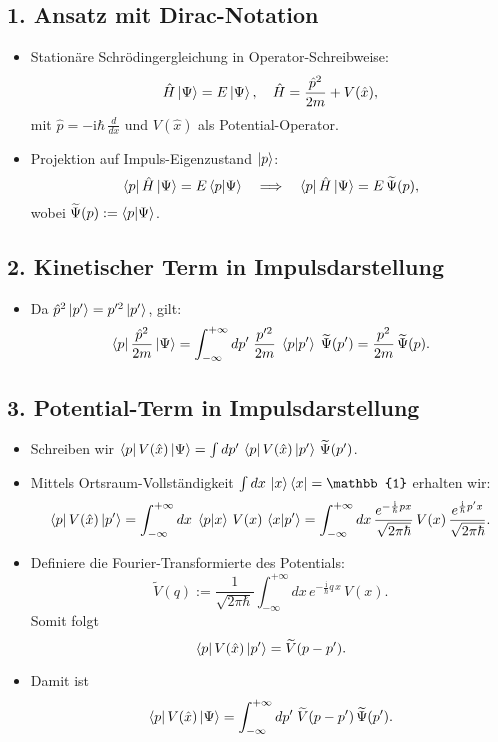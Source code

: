 \documentclass[12pt,a4paper]{scrartcl}
\begin{document}
\subsection*{1. Ansatz mit Dirac-Notation}

\begin{itemize}
  \item Stationäre Schrödingergleichung in Operator-Schreibweise:
  \[
    \hat H \ket{\Psi} = E \ket{\Psi}, \quad \hat H = \frac{\hat p^2}{2m} + V(\hat x),
  \]
  mit $\hat p = -\mathrm{i}\hbar\,\frac{d}{dx}$ und $V(\hat x)$ als Potential-Operator.
  \item Projektion auf Impuls-Eigenzustand $\ket{p}$:
  \[
    \bra{p} \hat H \ket{\Psi} = E \bra{p} \ket{\Psi} \quad\Longrightarrow\quad
    \bra{p} \hat H \ket{\Psi} = E\,\widetilde\Psi(p),
  \]
  wobei $\widetilde\Psi(p) := \braket{p}{\Psi}$.
\end{itemize}

\subsection*{2. Kinetischer Term in Impulsdarstellung}

\begin{itemize}
  \item Da $\hat p^2 \ket{p'} = p'^2 \ket{p'}$, gilt:
  \[
    \bra{p} \frac{\hat p^2}{2m} \ket{\Psi}
    = \int_{-\infty}^{+\infty} dp'\;\frac{p'^2}{2m}\;\braket{p}{p'}\;\widetilde\Psi(p')
    = \frac{p^2}{2m}\,\widetilde\Psi(p).
  \]
\end{itemize}

\subsection*{3. Potential-Term in Impulsdarstellung}

\begin{itemize}
  \item Schreiben wir $\bra{p} V(\hat x) \ket{\Psi} = \int dp'\,\bra{p}V(\hat x)\ket{p'}\,\widetilde\Psi(p')$.
  \item Mittels Ortsraum-Vollständigkeit $\int dx\,\ket{x}\bra{x} = \mathbb{1}$ erhalten wir:
  \[
    \bra{p}V(\hat x)\ket{p'}
    = \int_{-\infty}^{+\infty} dx\;\braket{p}{x}\,V(x)\,\braket{x}{p'}
    = \int_{-\infty}^{+\infty} dx\,\frac{e^{-\frac{\mathrm{i}}{\hbar}px}}{\sqrt{2\pi\hbar}}\,V(x)\,\frac{e^{\frac{\mathrm{i}}{\hbar}p'x}}{\sqrt{2\pi\hbar}}.
  \]
  \item Definiere die Fourier-Transformierte des Potentials:
  \[
    \widetilde V(q) 
    := \frac{1}{\sqrt{2\pi\hbar}} \int_{-\infty}^{+\infty} dx\,e^{-\frac{\mathrm{i}}{\hbar}q\,x}\,V(x).
  \]
  Somit folgt
  \[
    \bra{p}V(\hat x)\ket{p'} 
    = \widetilde V(p - p').
  \]
  \item Damit ist
  \[
    \bra{p}V(\hat x)\ket{\Psi}
    = \int_{-\infty}^{+\infty} dp'\;\widetilde V(p - p')\,\widetilde\Psi(p').
  \]
\end{itemize}
\end{document}
